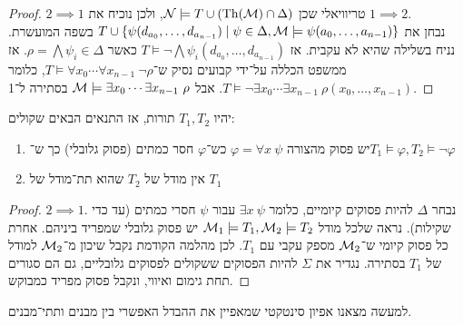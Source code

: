 \begin{proof}
	$2 \implies 1$ טריוויאלי שכן $\mathcal{N} \models T \cup (\operatorname{Th}(\mathcal{M}) \cap \Delta)$, ולכן נוכיח את $1 \implies 2$. \\
	נבחן את $T \cup \{ \psi(d_{a_0}, \ldots, d_{a_{n - 1}}) \mid \psi \in \Delta, \mathcal{M} \models \psi(a_0, \ldots, a_{n - 1}) \}$ בשפה המועשרת.
	נניח בשלילה שהיא לא עקבית.
	אז $T \models \lnot \bigwedge \psi_i(d_{a_0}, \ldots, d_{a_{n - 1}})$ כאשר $\rho = \bigwedge \psi_i \in \Delta$.
	אז ממשפט הכללה על־ידי קבועים נסיק ש־$T \models \forall x_0 \cdots \forall x_{n - 1}\ \lnot \rho$, כלומר $T \models \lnot \exists x_0 \cdots \exists x_{n - 1}\ \rho(x_0, \ldots, x_{n - 1})$.
	אבל $\mathcal{M} \models \exists x_0 \cdots \exists x_{n - 1}\ \rho$ בסתירה ל־1.
\end{proof}
\begin{corollary}
	יהיו $T_1, T_2$ תורות,
	אז התנאים הבאים שקולים:
	\begin{enumerate}
		\item יש פסוק מהצורה $\varphi = \forall x\ \psi$ כש־$\varphi$ חסר כמתים (פסוק גלובלי) כך ש־$T_1 \models \varphi, T_2 \models \lnot \varphi$
		\item אין מודל של $T_2$ שהוא תת־מודל של $T_1$
	\end{enumerate}
\end{corollary}
\begin{proof}
	$2 \implies 1$.
	נבחר $\Delta$ להיות פסוקים קיומיים, כלומר $\exists x\ \psi$ עבור $\psi$ חסרי כמתים (עד כדי שקילות).
	נראה שלכל מודל $\mathcal{M}_1 \models T_1, \mathcal{M}_2 \models T_2$ יש פסוק גלובלי שמפריד ביניהם.
	אחרת כל פסוק קיומי ש־$\mathcal{M}_2$ מספק עקבי עם $T_1$.
	לכן מהלמה הקודמת נקבל שיכון מ־$\mathcal{M}_2$ למודל של $T_1$ בסתירה.
	נגדיר את $\Sigma$ להיות הפסוקים ששקולים לפסוקים גלובליים, גם הם סגורים תחת גימום ואיווי, ונקבל פסוק מפריד כמבוקש.
\end{proof}
למעשה מצאנו אפיון סינטקטי שמאפיין את ההבדל האפשרי בין מבנים ותתי־מבנים.

\listoftheorems[title=הגדרות ומשפטים,ignoreall,show={theorem,definition},swapnumber,onlynamed={proposition,lemma}]


